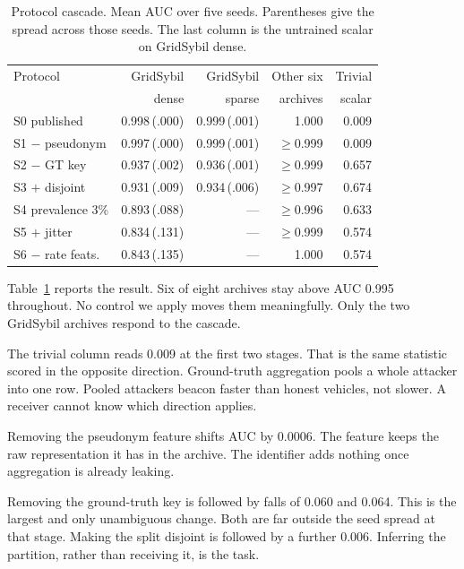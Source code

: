 \documentclass[conference]{IEEEtran}
\begin{document}
\begin{table}[t]
\caption{Protocol cascade. Mean AUC over five seeds.
Parentheses give the spread across those seeds.
The last column is the untrained scalar on GridSybil dense.}
\label{tab:cascade}
\centering
\footnotesize
\begin{tabular}{@{}lrrrr@{}}
\toprule
Protocol & GridSybil & GridSybil & Other six & Trivial \\
 & dense & sparse & archives & scalar \\
\midrule
S0 published & 0.998\,{\tiny(.000)} & 0.999\,{\tiny(.001)} & 1.000 & 0.009 \\
S1 $-$ pseudonym & 0.997\,{\tiny(.000)} & 0.999\,{\tiny(.001)} & $\geq$0.999 & 0.009 \\
S2 $-$ GT key & 0.937\,{\tiny(.002)} & 0.936\,{\tiny(.001)} & $\geq$0.999 & 0.657 \\
S3 $+$ disjoint & 0.931\,{\tiny(.009)} & 0.934\,{\tiny(.006)} & $\geq$0.997 & 0.674 \\
S4 prevalence 3\% & 0.893\,{\tiny(.088)} & --- & $\geq$0.996 & 0.633 \\
S5 $+$ jitter & 0.834\,{\tiny(.131)} & --- & $\geq$0.999 & 0.574 \\
S6 $-$ rate feats. & 0.843\,{\tiny(.135)} & --- & 1.000 & 0.574 \\
\bottomrule
\end{tabular}
\end{table}

Table~\ref{tab:cascade} reports the result.
Six of eight archives stay above AUC 0.995 throughout.
No control we apply moves them meaningfully.
Only the two GridSybil archives respond to the cascade.

The trivial column reads 0.009 at the first two stages.
That is the same statistic scored in the opposite direction.
Ground-truth aggregation pools a whole attacker into one row.
Pooled attackers beacon faster than honest vehicles, not slower.
A receiver cannot know which direction applies.

Removing the pseudonym feature shifts AUC by 0.0006.
The feature keeps the raw representation it has in the archive.
The identifier adds nothing once aggregation is already leaking.

Removing the ground-truth key is followed by falls of 0.060 and 0.064.
This is the largest and only unambiguous change.
Both are far outside the seed spread at that stage.
Making the split disjoint is followed by a further 0.006.
Inferring the partition, rather than receiving it, is the task.
\end{document}
